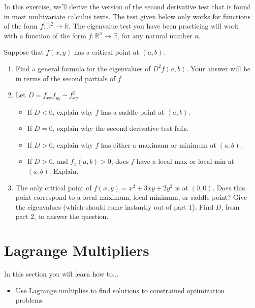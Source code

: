 
In this exercise, we'll derive the version of the second derivative test that is found in most multivariate calculus texts.  The test given below only works for functions of the form $f:\mathbb{R}^2\to\mathbb{R}$.  The eigenvalue test you have been practicing will work with a function of the form  $f:\mathbb{R}^n\to\mathbb{R}$, for any natural number $n$. 
\begin{problem}
 Suppose that $f(x,y)$ has a critical point at $(a,b)$.
\begin{enumerate}
 \item Find a general formula for the eigenvalues of $D^2f(a,b)$. Your answer will be in terms of the second partials of $f$.
 \item Let $D=f_{xx}f_{yy}-f_{xy}^2$. 
\begin{itemize}
 \item If $D<0$, explain why $f$ has a saddle point at $(a,b)$.
 \item If $D=0$, explain why the second derivative test fails.
 \item If $D>0$, explain why $f$ has either a maximum or minimum at $(a,b)$.
 \item If $D>0$, and $f_x(a,b)>0$, does $f$ have a local max or local min at $(a,b)$. Explain.
\end{itemize}
 \item The only critical point of $f(x,y) = x^2+3xy+2y^2$ is at $(0,0)$.  Does this point correspond to a local maximum, local minimum, or saddle point? Give the eigenvalues (which should come instantly out of part 1). Find $D$, from part 2, to answer the question.
\end{enumerate}

\end{problem}


\section{Lagrange Multipliers}
In this section you will learn how to...
\begin{itemize}
\item Use Lagrange multiplies to find solutions to constrained optimization problems
\end{itemize}

